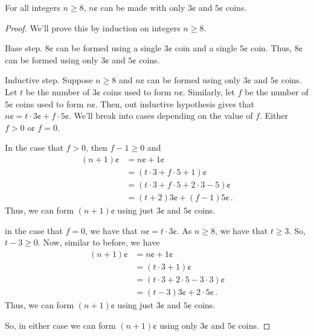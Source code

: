 \guard

\begin{prop}
\label{prop:3And5CentCoins}
  For all integers $n\geq 8$, $n\cent$ can be made with only $3\cent$ and $5\cent$ coins.
\end{prop}
\begin{proof}
  We'll prove this by induction on integers $n\geq 8$.

  Base step. $8\cent$ can be formed using a single $3\cent$ coin and a single $5\cent$ coin.
  Thus, $8\cent$ can be formed using only $3\cent$ and $5\cent$ coins.

  Inductive step. Suppose $n\geq 8$ and $n\cent$ can be formed using only $3\cent$ and $5\cent$ coins.
  Let $t$ be the number of $3\cent$ coins used to form $n\cent$.
  Similarly, let $f$ be the number of $5\cent$ coins used to form $n\cent$.
  Then, out inductive hypothesis gives that $n\cent = t\cdot3\cent + f\cdot5\cent$.
  We'll break into cases depending on the value of $f$.
  Either $f>0$ or $f=0$.

  In the case that $f>0$, then $f-1\geq 0$ and
  \begin{align*}
    (n+1)\cent  &= n\cent + 1\cent \\
                &= (t\cdot3 + f\cdot5 + 1)\cent \\
                &= (t\cdot3 + f\cdot5 + 2\cdot3 - 5)\cent\\
                &= (t+2)3\cent + (f-1)5\cent\,.
  \end{align*}
  Thus, we can form $(n+1)\cent$ using just $3\cent$ and $5\cent$ coins.

  in the case that $f=0$, we have that $n\cent = t\cdot3\cent$.
  As $n\geq 8$, we have that $t\geq 3$.
  So, $t-3\geq 0$.
  Now, similar to before, we have
  \begin{align*}
    (n+1)\cent  &= n\cent + 1\cent \\
                &= (t\cdot3 + 1)\cent \\
                &= (t\cdot3 + 2\cdot5 - 3\cdot3)\cent\\
                &= (t-3)3\cent + 2\cdot5\cent\,.
  \end{align*}
  Thus, we can form $(n+1)\cent$ using just $3\cent$ and $5\cent$ coins.

  So, in either case we can form $(n+1)\cent$ using only $3\cent$ and $5\cent$ coins.
\end{proof}
